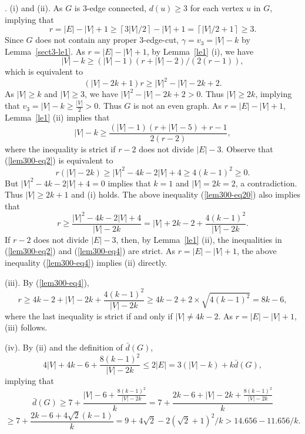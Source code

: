 \documentclass[11pt]{article}
\newcommand {\red} {\textcolor{red}}
\newcommand{\proof}
{{\noindent {\em Proof}.\quad}\setcounter{countclaim}{0}
\setcounter{countcase}{0}}
\newcounter{countclaim}
\newcounter{countcase}
\newcommand {\relabel}[1] {\label{#1} \red{[*: #1]}}\newcommand {\rebibitem}[1] {\bibitem{#1} \red{[*: #1]}}%
\def\relabel {\label} \def\rebibitem {\bibitem}  %
\begin{document}
\proof 
(i) and (ii).
As $G$ is $3$-edge connected, 
$d(u)\ge 3$ for each vertex $u$ in $G$, implying that 
$$
r=|E|-|V|+1\ge \left \lceil 3|V|/2 \right \rceil -|V|+1
= \left \lceil |V|/2+1\right \rceil\ge 3.
$$ 
Since $G$ does not contain any proper $3$-edge-cut,
$\gamma=v_3=|V|-k$ by Lemma~\ref{sect3-le1}.
As $r=|E|-|V|+1$, by Lemma~\ref{le1} (i), we have 
\begin{equation}\relabel{lem300-eq1}
|V|-k\ge (|V|-1)(r+|V|-2)/(2(r-1)),
\end{equation}
which is equivalent to 
$$
(|V|-2k+1)r\ge |V|^2-|V|-2k+2.
$$
As $|V|\ge k$ and $|V|\ge 3$, we have $|V|^2-|V|-2k+2>0$.
Thus $|V|\ge 2k$, implying that 
$v_3=|V|-k\ge \frac {|V|}2>0$. 
Thus $G$ is not an even graph. 
As $r=|E|-|V|+1$, 
Lemma~\ref{le1} (ii) implies that  
\begin{equation}\relabel{lem300-eq2}
|V|-k\ge \frac{(|V|-1)(r+|V|-5)+r-1}{2(r-2)},
\end{equation}
where the inequality is strict if 
$r-2$ does not divide $|E|-3$. 
Observe that (\ref{lem300-eq2}) is equivalent to 
\begin{equation}\relabel{lem300-eq20}
r(|V|-2k)\ge |V|^2-4k-2|V|+4\ge 4(k-1)^2\ge 0.
\end{equation}
But $|V|^2-4k-2|V|+4=0$ implies that $k=1$ and 
$|V|=2k=2$, 
a contradiction. Thus $|V|\ge 2k+1$ and (i) holds.
The above inequality (\ref{lem300-eq20})
also implies that 
\begin{equation}\relabel{lem300-eq4}
r\ge \frac{|V|^2-4k-2|V|+4}{|V|-2k}
=|V|+2k-2+\frac{4(k-1)^2}{|V|-2k}.
\end{equation} 
If $r-2$ does not divide $|E|-3$,
then, by Lemma~\ref{le1} (ii),
the inequalities in  (\ref{lem300-eq2}) and 
(\ref{lem300-eq4}) are strict.
As $r=|E|-|V|+1$, the above inequality (\ref{lem300-eq4})
implies (ii) directly.


(iii).
By (\ref{lem300-eq4}), 
\begin{equation}\relabel{lem300-eq30}
r\ge 4k-2+|V|-2k+\frac{4(k-1)^2}{|V|-2k}
\ge 4k-2+2\times \sqrt {4(k-1)^2}=8k-6,
\end{equation}
where the last inequality is strict if and only if  
$|V|\ne 4k-2$.
As $r=|E|-|V|+1$, (iii) follows. 

(iv).  By (ii) and the definition of $\bar d(G)$, 
$$
4|V|+4k-6+\frac{8(k-1)^2}{|V|-2k}\le 2|E|=3(|V|-k)+k\bar d(G),
$$
implying that 
$$
\bar d(G)\ge 7+\frac{|V|-6+\frac{8(k-1)^2}{|V|-2k}}{k}
=7+\frac{2k-6+|V|-2k+\frac{8(k-1)^2}{|V|-2k}}{k}
$$
$$
\ge 7+\frac{2k-6+4\sqrt 2 (k-1)}{k}
=9+4\sqrt 2-2(\sqrt 2+1)^2/k
>14.656-11.656/k.
$$
\end{document}
